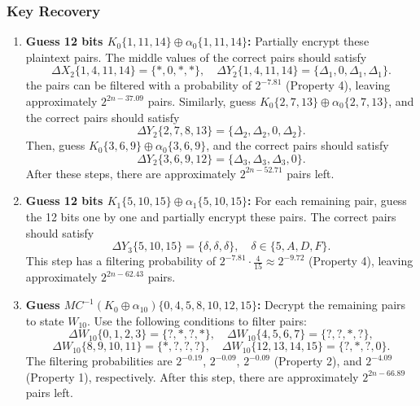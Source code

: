 \documentclass[journal=tosc,preprint]{iacrtrans}
\begin{document}
    \newpage
    \subsubsection{Key Recovery}

    \begin{enumerate}
        \item \textbf{Guess 12 bits $K_0\{1, 11, 14\} \oplus \alpha_0\{1, 11, 14\}$:}
              Partially encrypt these plaintext pairs. The middle values of the correct pairs should satisfy
              \[
                  \Delta X_2\{1, 4, 11, 14\} = \{\ast, 0, \ast, \ast\}, \quad \Delta Y_2\{1, 4, 11, 14\} = \{\Delta_1, 0, \Delta_1, \Delta_1\}.
              \]
              the pairs can be filtered with a probability of $2^{-7.81}$ (Property 4), leaving approximately $2^{2n-37.09}$ pairs.
              Similarly, guess $K_0\{2, 7, 13\} \oplus \alpha_0\{2, 7, 13\}$, and the correct pairs should satisfy
              \[
                  \Delta Y_2\{2, 7, 8, 13\} = \{\Delta_2, \Delta_2, 0, \Delta_2\}.
              \]
              Then, guess $K_0\{3, 6, 9\} \oplus \alpha_0\{3, 6, 9\}$, and the correct pairs should satisfy
              \[
                  \Delta Y_2\{3, 6, 9, 12\} = \{\Delta_3, \Delta_3, \Delta_3, 0\}.
              \]
              After these steps, there are approximately $2^{2n-52.71}$ pairs left.

        \item \textbf{Guess 12 bits $K_1\{5, 10, 15\} \oplus \alpha_1\{5, 10, 15\}$:}
              For each remaining pair, guess the 12 bits one by one and partially encrypt these pairs. The correct pairs should satisfy
              \[
                  \Delta Y_3\{5, 10, 15\} = \{\delta, \delta, \delta\}, \quad \delta \in \{5, A, D, F\}.
              \]
              This step has a filtering probability of $2^{-7.81} \cdot \frac{4}{15} \approx 2^{-9.72}$ (Property 4), leaving approximately $2^{2n-62.43}$ pairs.

        \item \textbf{Guess $MC^{-1}(K_0 \oplus \alpha_{10})\{0, 4, 5, 8, 10, 12, 15\}$:}
              Decrypt the remaining pairs to state $W_{10}$. Use the following conditions to filter pairs:
              \[
                  \Delta W_{10}\{0, 1, 2, 3\} = \{?, \ast, ?, \ast\}, \quad \Delta W_{10}\{4, 5, 6, 7\} = \{?, ?, \ast, ?\},
              \]
              \[
                  \Delta W_{10}\{8, 9, 10, 11\} = \{\ast, ?, ?, ?\}, \quad \Delta W_{10}\{12, 13, 14, 15\} = \{?, \ast, ?, 0\}.
              \]
              The filtering probabilities are $2^{-0.19}$, $2^{-0.09}$, $2^{-0.09}$ (Property 2), and $2^{-4.09}$ (Property 1), respectively. After this step, there are approximately $2^{2n-66.89}$ pairs left.


\end{enumerate}
\end{document}

